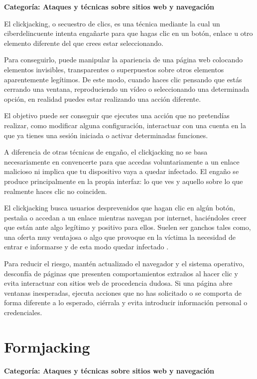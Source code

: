 \documentclass[
  spanish,
  a4paper,
  openany]{book}
\begin{document}
\textbf{Categoría: Ataques y técnicas sobre sitios web y navegación}

El clickjacking, o secuestro de clics, es una técnica mediante la cual un ciberdelincuente intenta engañarte para que hagas clic en un botón, enlace u otro elemento diferente del que crees estar seleccionando.

Para conseguirlo, puede manipular la apariencia de una página web colocando elementos invisibles, transparentes o superpuestos sobre otros elementos aparentemente legítimos. De este modo, cuando haces clic pensando que estás cerrando una ventana, reproduciendo un vídeo o seleccionando una determinada opción, en realidad puedes estar realizando una acción diferente.

El objetivo puede ser conseguir que ejecutes una acción que no pretendías realizar, como modificar alguna configuración, interactuar con una cuenta en la que ya tienes una sesión iniciada o activar determinadas funciones.

A diferencia de otras técnicas de engaño, el clickjacking no se basa necesariamente en convencerte para que accedas voluntariamente a un enlace malicioso ni implica que tu dispositivo vaya a quedar infectado. El engaño se produce principalmente en la propia interfaz: lo que ves y aquello sobre lo que realmente haces clic no coinciden.

El clickjacking busca usuarios desprevenidos que hagan clic en algún botón, pestaña o accedan a un enlace mientras navegan por internet, haciéndoles creer que están ante algo legítimo y positivo para ellos. Suelen ser ganchos tales como, una oferta muy ventajosa o algo que provoque en la víctima la necesidad de entrar e informarse y de esta modo quedar infectado \citep{WIKI-clickjacking}.

Para reducir el riesgo, mantén actualizado el navegador y el sistema operativo, desconfía de páginas que presenten comportamientos extraños al hacer clic y evita interactuar con sitios web de procedencia dudosa. Si una página abre ventanas inesperadas, ejecuta acciones que no has solicitado o se comporta de forma diferente a lo esperado, ciérrala y evita introducir información personal o credenciales.

\section{Formjacking}\label{formjacking}

\textbf{Categoría: Ataques y técnicas sobre sitios web y navegación}
\end{document}
